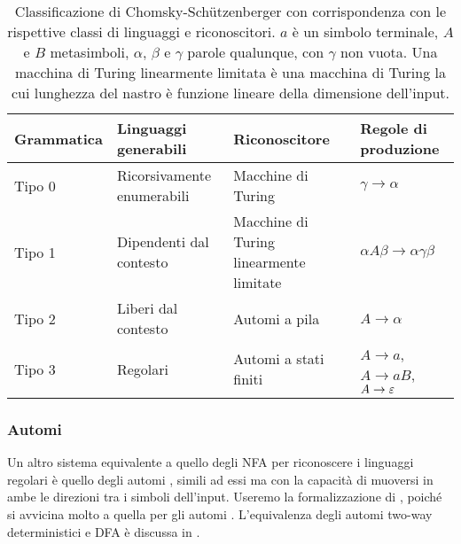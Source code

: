 \begin{table}
	\caption{Classificazione di Chomsky-Schützenberger con corrispondenza con le rispettive classi di linguaggi e riconoscitori. $a$ è un simbolo terminale, $A$ e $B$ metasimboli, $\alpha$, $\beta$ e $\gamma$ parole qualunque, con $\gamma$ non vuota. Una macchina di Turing linearmente limitata è una macchina di Turing la cui lunghezza del nastro è funzione lineare della dimensione dell'input.}
	\label{tab:prel:chomskyhier}
	\centering
	\begin{tabularx}{\textwidth}{lXXl}
		\toprule
		\textbf{Grammatica} & \textbf{Linguaggi generabili} & \textbf{Riconoscitore}                  & \textbf{Regole di produzione}         \\
		\midrule
		Tipo 0              & Ricorsivamente enumerabili    & Macchine di Turing                      & $\gamma\to\alpha$                     \\
		Tipo 1              & Dipendenti dal contesto       & Macchine di Turing linearmente limitate & $\alpha A\beta\to\alpha\gamma\beta$   \\
		Tipo 2              & Liberi dal contesto           & Automi a pila                           & $A\to\alpha$                          \\
		Tipo 3              & Regolari                      & Automi a stati finiti                   & $A\to a$, $A\to aB$, $A\to\varepsilon$ \\
		\bottomrule
	\end{tabularx}
\end{table}

\subsubsection{Automi }
Un altro sistema equivalente a quello degli NFA per riconoscere i linguaggi regolari è quello degli automi , simili ad essi ma con la capacità di muoversi in ambe le direzioni tra i simboli dell'input. Useremo la formalizzazione di \cite{Pighizzini:14:limitedRE}, poiché si avvicina molto a quella per gli automi . L'equivalenza degli automi two-way deterministici e DFA è discussa in \cite{Shallit:09:secondLFA}.

